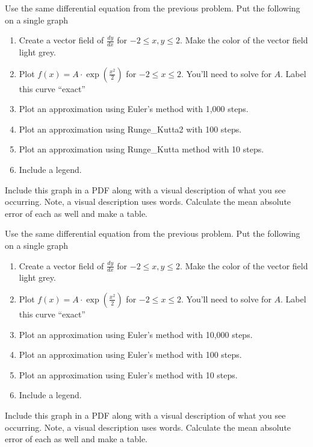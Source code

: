 \documentclass[11pt,letterpaper]{article}
\begin{document}
\begin{problem}
 Use the same differential equation from the previous problem. Put the following on a single graph
\begin{enumerate}
 \item Create a vector field of $\frac{dy}{dx}$ for $-2\le x,y\le 2$. Make the color of the vector field light grey.
 \item Plot $f(x) = A\cdot\exp\left(\frac{x^2}{2}\right)$ for $-2\le x\le 2$. You'll need to solve
for $A$. Label this curve ``exact''
 \item Plot an approximation using Euler's method with 1,000 steps.
 \item Plot an approximation using Runge\_Kutta2 with 100 steps.
 \item Plot an approximation using Runge\_Kutta method with 10 steps.
 \item Include a legend.
\end{enumerate}

Include this graph in a PDF along with a visual description of what you see occurring. Note, a visual
description uses words. Calculate the mean absolute error of each as well and make a table.


\end{problem}


\begin{problem}
 Use the same differential equation from the previous problem. Put the following on a single graph
\begin{enumerate}
 \item Create a vector field of $\frac{dy}{dx}$ for $-2\le x,y\le 2$. Make the color of the vector field light grey.
 \item Plot $f(x) = A\cdot\exp\left(\frac{x^2}{2}\right)$ for $-2\le x\le 2$. You'll need to solve
for $A$. Label this curve ``exact''
 \item Plot an approximation using Euler's method with 10,000 steps.
 \item Plot an approximation using Euler's method with 100 steps.
 \item Plot an approximation using Euler's method with 10 steps.
 \item Include a legend.
\end{enumerate}

Include this graph in a PDF along with a visual description of what you see occurring. Note, a visual
description uses words. Calculate the mean absolute error of each as well and make a table.


\end{problem}
\end{document}
